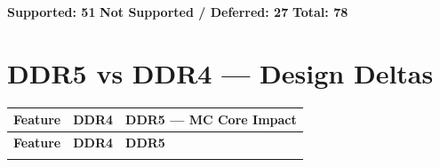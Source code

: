 \documentclass[11pt,a4paper]{article}
\begin{document}
\begin{center}
{\small\color{gray}
\textbf{Supported: 51} \quad \textbf{Not Supported / Deferred: 27} \quad \textbf{Total: 78}
}
\end{center}

\section{DDR5 vs DDR4 --- Design Deltas}

\begin{longtable}{L{3.5cm} L{4cm} L{7cm}}
\toprule
\textbf{Feature} & \textbf{DDR4} & \textbf{DDR5 --- MC Core Impact} \\
\midrule
\endfirsthead\toprule\textbf{Feature}&\textbf{DDR4}&\textbf{DDR5}\\\midrule\endhead
\bottomrule\endfoot


\end{longtable}
\end{document}
